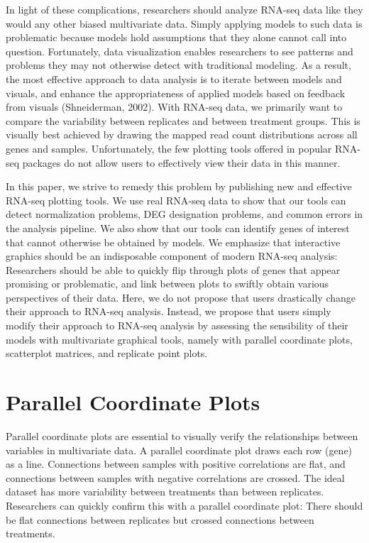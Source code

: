 \documentclass[referee]{biom}
\begin{document}
In light of these complications, researchers should analyze RNA-seq data like they would any other biased multivariate data. Simply applying models to such data is problematic because models hold assumptions that they alone cannot call into question. Fortunately, data visualization enables researchers to see patterns and problems they may not otherwise detect with traditional modeling. As a result, the most effective approach to data analysis is to iterate between models and visuals, and enhance the appropriateness of applied models based on feedback from visuals (Shneiderman, 2002). With RNA-seq data, we primarily want to compare the variability between replicates and between treatment groups. This is visually best achieved by drawing the mapped read count distributions across all genes and samples. Unfortunately, the few plotting tools offered in popular RNA-seq packages do not allow users to effectively view their data in this manner.

In this paper, we strive to remedy this problem by publishing new and effective RNA-seq plotting tools. We use real RNA-seq data to show that our tools can detect normalization problems, DEG designation problems, and common errors in the analysis pipeline. We also show that our tools can identify genes of interest that cannot otherwise be obtained by models. We emphasize that interactive graphics should be an indisposable component of modern RNA-seq analysis: Researchers should be able to quickly flip through plots of genes that appear promising or problematic, and link between plots to swiftly obtain various perspectives of their data. Here, we do not propose that users drastically change their approach to RNA-seq analysis. Instead, we propose that users simply modify their approach to RNA-seq analysis by assessing the sensibility of their models with multivariate graphical tools, namely with parallel coordinate plots, scatterplot matrices, and replicate point plots.

\section{Parallel Coordinate Plots}
\label{s:Parallel Coordinate Plots}

Parallel coordinate plots are essential to visually verify the relationships between variables in multivariate data. A parallel coordinate plot draws each row (gene) as a line. Connections between samples with positive correlations are flat, and connections between samples with negative correlations are crossed. The ideal dataset has more variability between treatments than between replicates. Researchers can quickly confirm this with a parallel coordinate plot: There should be flat connections between replicates but crossed connections between treatments.
\end{document}
